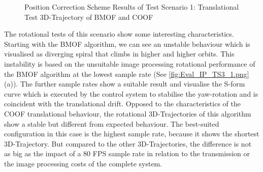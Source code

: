 \begin{figure}[H]
\hfill
{}
\begin{center}
\end{center}
\caption{Position Correction Scheme Results of Test Scenario 1: Translational Test 3D-Trajectory of BMOF and COOF}
\label{fig:PCS_TS1_BMOF_COOF_Trans.pdf}
\end{figure}

The rotational tests of this scenario show some interesting characteristics. Starting with the \gls{BMOF} algorithm, we can see an unstable behaviour which is visualised as diverging spiral that climbs in higher and higher orbits. This instability is based on the unsuitable image processing rotational performance of the \gls{BMOF} algorithm at the lowest sample rate (See \ref{fig:Eval_IP_TS3_1.png}(a)). The further sample rates show a suitable result and visualise the S-form curve which is executed by the control system to stabilise the yaw-rotation and  
is coincident with the translational drift. Opposed to the characteristics of the \gls{COOF} translational behaviour, the rotational 3D-Trajectories of this algorithm show a stable but different from expected behaviour. The best-suited configuration in this case is the highest sample rate, because it shows the shortest 3D-Trajectory. But compared to the other 3D-Trajectories, the difference is not as big as the impact of a 80 \gls{FPS} sample rate in relation to the transmission or the image processing costs of the complete system.   

